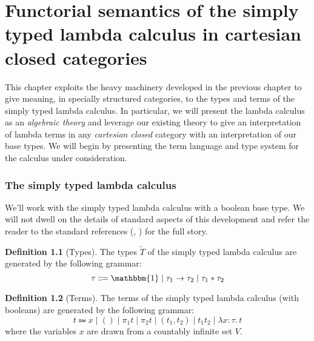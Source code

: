 \documentclass[12pt,twoside]{reedthesis}
\theoremstyle{definition}
\newtheorem{definition}{Definition}
\theoremstyle{remark}
\theoremstyle{plain}
\begin{document}
\chapter{Functorial semantics of the simply typed lambda calculus in cartesian closed categories}
This chapter exploits the heavy machinery developed in the previous chapter to
give meaning, in specially structured categories, to the types and terms of the
simply typed lambda calculus. In particular, we will present the lambda calculus
as an \emph{algebraic theory} and leverage our existing theory to give an
interpretation of lambda terms in any \emph{cartesian closed} category with an
interpretation of our base types. We will begin by presenting the term language
and type system for the calculus under consideration.

\subsection{The simply typed lambda calculus}

We'll work with the simply typed lambda calculus with a boolean base type. We
will not dwell on the details of standard aspects of this development and refer
the reader to the standard references (\cite{pierce_types_2002},
\cite{harper_practical_2016}) for the full story.

\newcommand{\termob}{\mathbbm{1}}
\newcommand{\bool}{\mathbb{B}}

\begin{definition}[Types]
  The types \( \widetilde{T} \) of the simply typed lambda calculus are
  generated by the following grammar:
  \[
    \tau \Coloneqq \termob \mid \tau_{1} \rightarrow \tau_{2} \mid \tau_{1} * \tau_{2}
  \]
\end{definition}

\newcommand{\abstr}[3]{\lambda #1 : #2.\, #3}

\begin{definition}[Terms]
  The terms of the simply typed lambda calculus (with booleans) are generated by the
  following grammar:
  \[
    t \Coloneq x \mid () \mid \pi_{1} t \mid \pi_{2} t \mid (t_{1}, t_{2}) \mid t_{1} t_{2} \mid \abstr{x}{\tau}{t}
  \]
  where the variables $x$ are drawn from a countably infinite set \( V \).
\end{definition}
\end{document}
